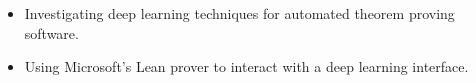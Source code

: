 
\begin{itemize}
    \item Investigating deep learning techniques for automated theorem proving software.
    \item Using Microsoft's Lean prover to interact with a deep learning interface.
\end{itemize}

